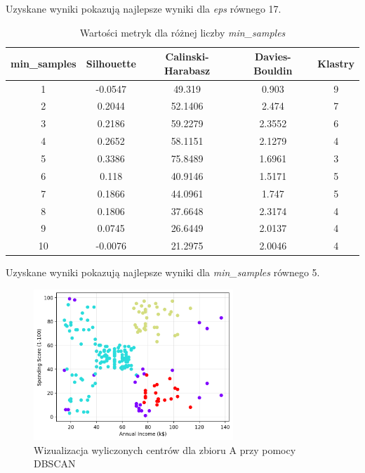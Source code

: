 \documentclass[a4paper,11pt]{article}
\begin{document}
Uzyskane wyniki pokazują najlepsze wyniki dla \textit{eps} równego 17.

\begin{table}[H]
\centering
\begin{tabular}{|c|c|c|c|c|}
\hline
\textbf{min\_samples} & \textbf{Silhouette} & \textbf{Calinski-Harabasz} & \textbf{Davies-Bouldin} & \textbf{Klastry} \\ \hline
1 & -0.0547 & 49.319 & 0.903 & 9 \\ \hline
2 & 0.2044 & 52.1406 & 2.474 & 7 \\ \hline
3 & 0.2186 & 59.2279 & 2.3552 & 6 \\ \hline
4 & 0.2652 & 58.1151 & 2.1279 & 4 \\ \hline
5 & 0.3386 & 75.8489 & 1.6961 & 3 \\ \hline
6 & 0.118 & 40.9146 & 1.5171 & 5 \\ \hline
7 & 0.1866 & 44.0961 & 1.747 & 5 \\ \hline
8 & 0.1806 & 37.6648 & 2.3174 & 4 \\ \hline
9 & 0.0745 & 26.6449 & 2.0137 & 4 \\ \hline
10 & -0.0076 & 21.2975 & 2.0046 & 4 \\ \hline
\end{tabular}
\caption{Wartości metryk dla różnej liczby \textit{min\_samples}}
\label{tab:dbscan11}
\end{table}

Uzyskane wyniki pokazują najlepsze wyniki dla \textit{min\_samples} równego 5.

\begin{figure}[H]
    \centering
    \includegraphics[width=0.67\textwidth]{images2/dbscan/d1.png}
    \caption{Wizualizacja wyliczonych centrów dla zbioru A przy pomocy DBSCAN}
    \label{fig:em_a_12}
\end{figure}
\end{document}
